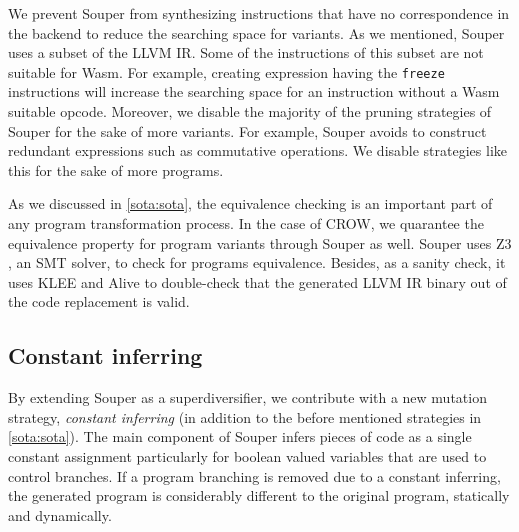 We prevent Souper from synthesizing instructions that have no correspondence in the \wasm backend to reduce the searching space for variants. As we mentioned, Souper uses a subset of the LLVM IR. Some of the instructions of this subset are not suitable for Wasm. For example, creating expression having the  \texttt{freeze} instructions will increase the searching space for an instruction without a Wasm suitable opcode.
Moreover, we disable the majority of the pruning strategies of Souper for the sake of more variants. For example, Souper avoids to construct redundant expressions such as commutative operations. We disable strategies like this for the sake of more programs.  %


As we discussed in \autoref{sota:sota}, the equivalence checking is an important part of any program transformation process. In the case of CROW, we quarantee the equivalence property for program variants through Souper as well. Souper uses Z3 \citationneeded, an SMT solver, to check for programs equivalence.  Besides, as a sanity check, it uses KLEE and Alive to double-check that the generated LLVM IR binary out of the code replacement is valid.



\subsection*{Constant inferring}

By extending Souper as a superdiversifier, we contribute with a new mutation strategy, \emph{constant inferring} (in addition to the before mentioned strategies in \autoref{sota:sota}).  
The main component of Souper infers pieces of code as a single constant assignment particularly for boolean valued variables that are used to control branches.
If a program branching is removed due to a constant inferring, the generated program is considerably different to the original program, statically and dynamically.

